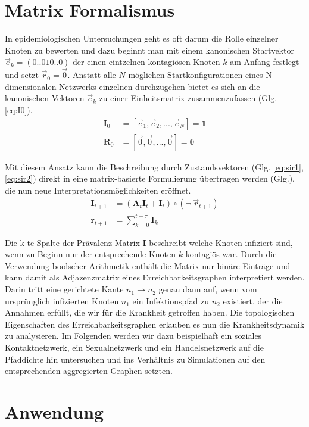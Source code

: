 \section{Matrix Formalismus}

In epidemiologischen Untersuchungen geht es oft darum die Rolle einzelner Knoten zu bewerten und dazu beginnt man mit einem kanonischen Startvektor $\vec{e}_k = (0 .. 0 1 0 .. 0)$ der einen eintzelnen kontagiösen Knoten $k$ am Anfang festlegt und setzt $\vec{r}_0 = \vec{0}$. Anstatt alle $N$ möglichen Startkonfigurationen eines N-dimensionalen Netzwerks einzelnen durchzugehen bietet es sich an die kanonischen Vektoren $\vec{e}_k$ zu einer Einheitsmatrix zusammenzufassen (Glg. \ref{eq:I0}).
\begin{align}
 \textbf{I}_0 &= \left[ \vec{e}_1,\vec{e}_2, ... , \vec{e}_N \right] = \mathbb{1} \label{eq:I0} \\
 \textbf{R}_0 &= \left[ \vec{0},\vec{0}, ... , \vec{0} \right] = \mathbb{0}
\end{align}

Mit diesem Ansatz kann die Beschreibung durch Zustandsvektoren (Glg. \ref{eq:sir1},\ref{eq:sir2}) direkt in eine matrix-basierte Formulierung übertragen werden (Glg.), die nun neue Interpretationsmöglichkeiten eröffnet.
\begin{align}
 \textbf{I}_{t+1} &= (\textbf{A}_t \textbf{I}_t + \textbf{I}_t) \circ (\neg ~ \vec{r}_{t+1}) \label{eq:SIR1} \\
 \textbf{r}_{t+1} &= \sum_{k=0}^{t-\tau} \textbf{I}_k \label{eq:SIR2}
\end{align}

Die k-te Spalte der Prävalenz-Matrix \textbf{I} beschreibt welche Knoten infiziert sind, wenn zu Beginn nur der entsprechende Knoten $k$ kontagiös war. Durch die Verwendung boolscher Arithmetik enthält die Matrix nur binäre Einträge und kann damit als Adjazenzmatrix eines Erreichbarkeitsgraphen interpretiert werden. Darin tritt eine gerichtete Kante $n_1 \rightarrow n_2$ genau dann auf, wenn vom ursprünglich infizierten Knoten $n_1$ ein Infektionspfad zu $n_2$ existiert, der die Annahmen erfüllt, die wir für die Krankheit getroffen haben. Die topologischen Eigenschaften des Erreichbarkeitsgraphen erlauben es nun die Krankheitsdynamik zu analysieren. Im Folgenden werden wir dazu beispielhaft ein soziales Kontaktnetzwerk, ein Sexualnetzwerk und ein Handelsnetzwerk auf die Pfaddichte hin untersuchen und ins Verhältnis zu Simulationen auf den entsprechenden aggregierten Graphen setzten.

\section{Anwendung}



